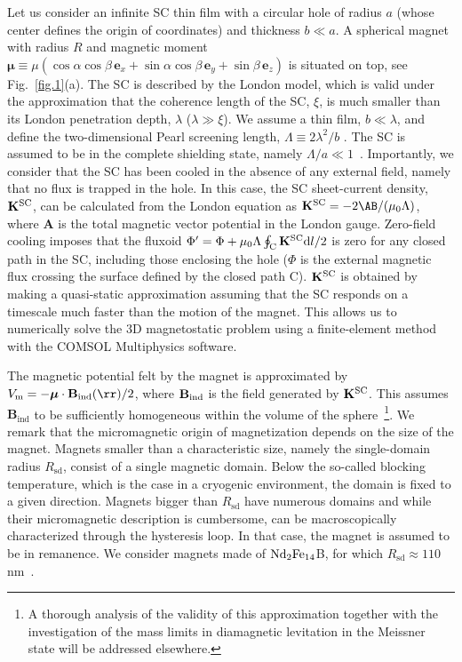 \documentclass[twocolumn,superscriptaddress,floatfix,preprintnumbers,prl]{revtex4}
\begin{document}
Let us consider an infinite SC thin film with a circular hole of radius $a$ (whose center defines the origin of coordinates) and thickness $b \ll a$. A  spherical magnet with
radius $R$ and magnetic moment $\boldsymbol{\mu} \equiv \mu(\cos \alpha \cos \beta\,\mathbf{e}_x+\sin \alpha \cos \beta\,\mathbf{e}_y+ \sin \beta \,\mathbf{e}_z)$ is situated on top, see Fig.~\ref{fig.1}(a). 
The SC is described by the London model, which is valid under the approximation that the coherence length of the SC, $\xi$, is much smaller than its London penetration depth, $\lambda$ ($\lambda \gg \xi$). %
We assume a thin film, $b\ll \lambda$, and define the 
two-dimensional Pearl screening length, $\Lambda \equiv 2 \lambda^2/b$ \cite{clem,pearl}.  
The SC is assumed to be in the complete shielding state, namely $\Lambda/a\ll1$~\cite{Brojeny2003,Mawatari2012}.
Importantly, we consider that the SC has been cooled in the absence of any external field, namely that no flux is trapped in the hole. In this case, the SC sheet-current density, ${\bf K}^\text{SC}$, can be calculated from the London equation as ${\bf K}^\text{SC} = - 2 \AB/(\mu_0 \Lambda)$,
where $\mathbf{A}$ is the total magnetic vector potential in the London gauge. 
Zero-field cooling imposes that the fluxoid \cite{tinkham,cardwell} $\Phi'=\Phi + \mu_0 \Lambda \oint_{\rm C}  \mathbf{K}^{\rm SC} \text{d}l /2 $ is zero for any closed path in the SC, including those enclosing the hole ($\Phi$ is the external magnetic flux crossing the surface defined by the closed path C). 
%
${\bf K}^\text{SC}$ is obtained by making a quasi-static approximation assuming that the SC responds on a timescale much faster than the motion of the magnet. This allows us to numerically solve the 3D magnetostatic problem using a finite-element method with the COMSOL Multiphysics software.  
%

The magnetic potential felt by the magnet is approximated by
$V_{\rm m}=-\boldsymbol{\mu} \cdot \mathbf{B}_{\rm ind}(\rr)/2$, where $\mathbf{B}_{\rm ind}$ is the field generated by  $\mathbf{K}^{\rm SC}$. This assumes $\mathbf{B}_\text{ind}$ to be sufficiently homogeneous within the volume of the sphere~\footnote{A thorough analysis of the validity of this approximation together with the investigation of the mass limits in diamagnetic levitation in the Meissner state will be addressed elsewhere.}. We remark that the micromagnetic origin of magnetization depends on the size of the magnet. Magnets smaller than a characteristic size, namely the single-domain radius $R_\text{sd}$, consist of a single magnetic domain. Below the so-called blocking temperature, which is the case in a cryogenic environment, the domain is fixed to a given direction.  
Magnets bigger than $R_\text{sd}$ have numerous domains and while their micromagnetic description is cumbersome, can be macroscopically characterized through the hysteresis loop. In that case, the magnet is assumed to be in remanence. We consider magnets made of ${\rm Nd}_2{\rm Fe}_{14}$B, for which $R_\text{sd}\approx 110$nm~\cite{coey}. 
\end{document}
